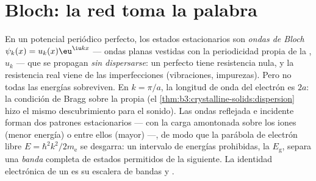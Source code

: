 \section{Bloch: la red toma la palabra}

\begin{theorem}\label{thm:b3:electrons-in-solids:bloch}
En un potencial periódico perfecto, los estados estacionarios son
\emph{ondas de Bloch} $\psi_k(x) = u_k(x)\eu^{\iu kx}$ ---
ondas planas vestidas con la periodicidad propia de la , $u_k$ ---
que se propagan \emph{sin dispersarse}: un  perfecto tiene
resistencia nula, y la resistencia real viene de las imperfecciones
(vibraciones, impurezas). Pero no todas las energías sobreviven. En
$k = \pi/a$, la longitud de onda del electrón es $2a$: la condición de Bragg
sobre la propia  (el \cref{thm:b3:crystalline-solids:dispersion}
hizo el mismo descubrimiento para el sonido). Las ondas reflejada e incidente
forman dos patrones estacionarios --- con la carga amontonada sobre los iones
(menor energía) o entre ellos (mayor) ---, de modo que la parábola de
electrón libre $E = \hbar^2k^2/2m_{\text{e}}$ se desgarra: un intervalo de
energías prohibidas, la \emph{} $E_{\text{g}}$, separa
una \emph{banda} completa de estados permitidos de la siguiente. La
identidad electrónica de un  es su escalera de bandas y .
\end{theorem}
\admitted

